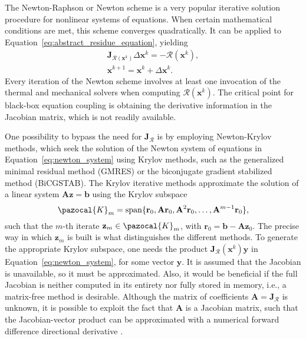           The Newton-Raphson or Newton scheme is a very popular iterative solution procedure for nonlinear systems of equations.
          When certain mathematical conditions are met, this scheme converges quadratically.
          It can be applied to Equation~\eqref{eq:abstract_residue_equation}, yielding
          \begin{gather}
            \bm{\mathbf{J}}_{\bm{\mathcal{R}}(\mathbf{x}^k)}\Delta \mathbf{x}^k = - \bm{\mathcal{R}}(\mathbf{x}^k), \label{eq:newton_system}\\
            \mathbf{x}^{k+1} = \mathbf{x}^k + \Delta \mathbf{x}^k. \label{eq:newton_iter}
          \end{gather}
          Every iteration of the Newton scheme involves at least one invocation of the thermal and mechanical solvers when computing $\bm{\mathcal{R}}\left(\mathbf{x}^{k}\right)$.
          The critical point for black-box equation coupling is obtaining the derivative information in the Jacobian matrix, which is not readily available.

          One possibility to bypass the need for $\bm{\mathbf{J}}_{\bm{\mathcal{R}}}$ is by employing Newton-Krylov methods, which seek the solution of the Newton system of equations in Equation~\eqref{eq:newton_system} using Krylov methods, such as the generalized minimal residual method (GMRES) or the biconjugate gradient stabilized method (BiCGSTAB).
          The Krylov iterative methods approximate the solution of a linear system \(\mathbf{A} \mathbf{z} = \mathbf{b}\) using the Krylov subspace
          \begin{equation}
            \pazocal{K}_m = \operatorname{span}\{\mathbf{r}_0, \mathbf{A}\mathbf{r}_0, \mathbf{A}^2 \mathbf{r}_0, \dots, \mathbf{A}^{m-1}\mathbf{r}_0\},
          \end{equation}
          such that the \(m\)-th iterate  \(\mathbf{z}_m\in \pazocal{K}_m\), with \(\mathbf{r}_0 = \mathbf{b} - \mathbf{A} \mathbf{z}_0\).
          The precise way in which \(\mathbf{z}_m\) is built is what distinguishes the different methods.
          To generate the appropriate Krylov subspace, one needs the product \(\bm{\mathbf{J}}_{\bm{\mathcal{R}}}(\mathbf{x}^k) \mathbf{y}\) in Equation~\eqref{eq:newton_system}, for some vector \(\mathbf{y}\).
          It is assumed that the Jacobian is unavailable, so it must be approximated.
          Also, it would be beneficial if the full Jacobian is neither computed in its entirety nor fully stored in memory, i.e., a matrix-free method is desirable.
          Although the matrix of coefficients $\mathbf{A}=\bm{\mathbf{J}}_{\bm{\mathcal{R}}}$ is unknown, it is possible to exploit the fact that $\mathbf{A}$ is a Jacobian matrix, such that the Jacobian-vector product can be approximated with a numerical forward difference directional derivative \citep{kelley_solving_2003}.

